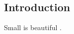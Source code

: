 \documentclass{article}
\begin{document}
\subsection{Introduction}
Small is beautiful\cite{albaker2009survey} . 








\end{document}
